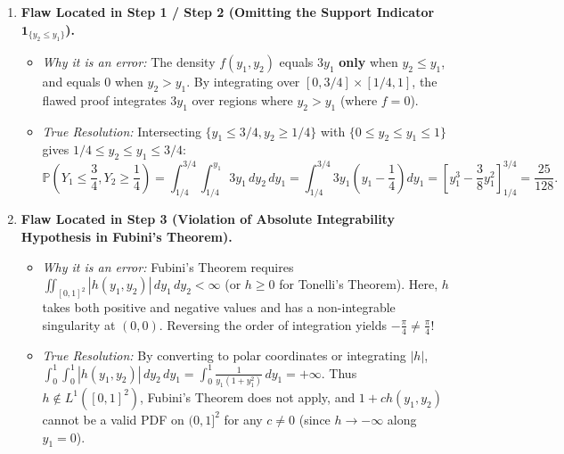 \documentclass[11pt, letterpaper]{article}
\theoremstyle{definition}
\theoremstyle{remark}
\begin{document}
\begin{enumerate}[label=\textbf{Critique of Diagnostic Problem \arabic*:}, leftmargin=0pt, itemindent=0pt]
    \item \textbf{Flaw Located in Step 1 / Step 2 (Omitting the Support Indicator $\mathbf{1}_{\{y_2 \le y_1\}}$).}
    \begin{itemize}
        \item \emph{Why it is an error:} The density $f(y_1, y_2)$ equals $3y_1$ \textbf{only} when $y_2 \le y_1$, and equals $0$ when $y_2 > y_1$. By integrating over $[0, 3/4] \times [1/4, 1]$, the flawed proof integrates $3y_1$ over regions where $y_2 > y_1$ (where $f = 0$).
        \item \emph{True Resolution:} Intersecting $\{y_1 \le 3/4, y_2 \ge 1/4\}$ with $\{0 \le y_2 \le y_1 \le 1\}$ gives $1/4 \le y_2 \le y_1 \le 3/4$:
        \[
            \mathbb{P}\!\left(Y_1 \le \frac{3}{4}, Y_2 \ge \frac{1}{4}\right) = \int_{1/4}^{3/4} \int_{1/4}^{y_1} 3y_1 \, dy_2 \, dy_1 = \int_{1/4}^{3/4} 3y_1\left(y_1 - \frac{1}{4}\right) dy_1 = \left[ y_1^3 - \frac{3}{8} y_1^2 \right]_{1/4}^{3/4} = \frac{25}{128}.
        \]
    \end{itemize}

    \item \textbf{Flaw Located in Step 3 (Violation of Absolute Integrability Hypothesis in Fubini's Theorem).}
    \begin{itemize}
        \item \emph{Why it is an error:} Fubini's Theorem requires $\iint_{[0,1]^2} |h(y_1, y_2)|\,dy_1\,dy_2 < \infty$ (or $h \ge 0$ for Tonelli's Theorem). Here, $h$ takes both positive and negative values and has a non-integrable singularity at $(0, 0)$. Reversing the order of integration yields $-\frac{\pi}{4} \neq \frac{\pi}{4}$!
        \item \emph{True Resolution:} By converting to polar coordinates or integrating $|h|$, $\int_0^1 \int_0^1 |h(y_1, y_2)|\,dy_2\,dy_1 = \int_0^1 \frac{1}{y_1 (1+y_1^2)}\,dy_1 = +\infty$. Thus $h \notin L^1([0,1]^2)$, Fubini's Theorem does not apply, and $1 + c h(y_1, y_2)$ cannot be a valid PDF on $(0,1]^2$ for any $c \neq 0$ (since $h \to -\infty$ along $y_1 = 0$).
    \end{itemize}


\end{enumerate}
\end{document}

